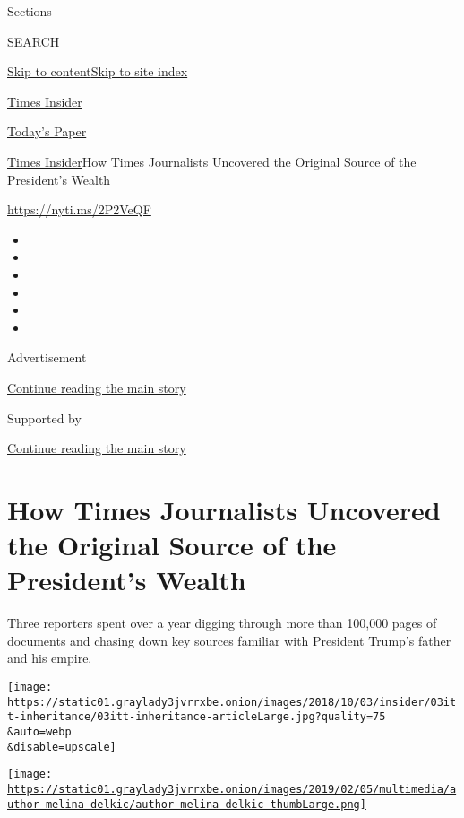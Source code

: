 Sections

SEARCH

\protect\hyperlink{site-content}{Skip to
content}\protect\hyperlink{site-index}{Skip to site index}

\href{https://www.nytimes3xbfgragh.onion/section/reader-center}{Times
Insider}

\href{https://myaccount.nytimes3xbfgragh.onion/auth/login?response_type=cookie\&client_id=vi}{}

\href{https://www.nytimes3xbfgragh.onion/section/todayspaper}{Today's
Paper}

\href{/section/reader-center}{Times Insider}\textbar{}How Times
Journalists Uncovered the Original Source of the President's Wealth

\url{https://nyti.ms/2P2VeQF}

\begin{itemize}
\item
\item
\item
\item
\item
\item
\end{itemize}

Advertisement

\protect\hyperlink{after-top}{Continue reading the main story}

Supported by

\protect\hyperlink{after-sponsor}{Continue reading the main story}

\hypertarget{how-times-journalists-uncovered-the-original-source-of-the-presidents-wealth}{%
\section{How Times Journalists Uncovered the Original Source of the
President's
Wealth}\label{how-times-journalists-uncovered-the-original-source-of-the-presidents-wealth}}

Three reporters spent over a year digging through more than 100,000
pages of documents and chasing down key sources familiar with President
Trump's father and his empire.

\texttt{[image: https://static01.graylady3jvrrxbe.onion/images/2018/10/03/insider/03itt-inheritance/03itt-inheritance-articleLarge.jpg?quality=75\\\&auto=webp\\\&disable=upscale]}

\href{https://www.nytimes3xbfgragh.onion/by/melina-delkic}{\texttt{[image: https://static01.graylady3jvrrxbe.onion/images/2019/02/05/multimedia/author-melina-delkic/author-melina-delkic-thumbLarge.png]}}

